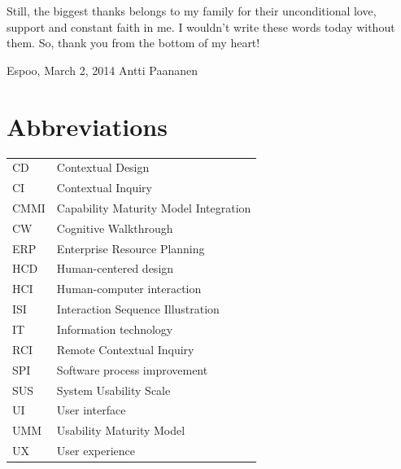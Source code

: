 \documentclass[12pt,a4paper,oneside,pdftex]{report}
\newcommand{\DATE}{March 2, 2014}
\newcommand{\AUTHOR}{Antti Paananen}
\begin{document}
Still, the biggest thanks belongs to my family for their unconditional love, support and constant faith in me. I wouldn't write these words today without them.
So, thank you from the bottom of my heart! 

\vskip 10mm

\noindent Espoo, \DATE
\vskip 5mm
\noindent\AUTHOR

\cleardoublepage
% 

\chapter*{Abbreviations}


\noindent
\begin{longtable}{@{}p{}p{}@{}}
CD & Contextual Design \\
CI & Contextual Inquiry \\
CMMI & Capability Maturity Model Integration \\
CW & Cognitive Walkthrough\\
ERP & Enterprise Resource Planning \\
HCD & Human-centered design \\
HCI & Human-computer interaction \\
ISI & Interaction Sequence Illustration \\
IT & Information technology \\
RCI & Remote Contextual Inquiry \\
SPI & Software process improvement\\
SUS & System Usability Scale \\
UI & User interface \\
UMM & Usability Maturity Model \\
UX & User experience \\





\end{longtable}
\end{document}
